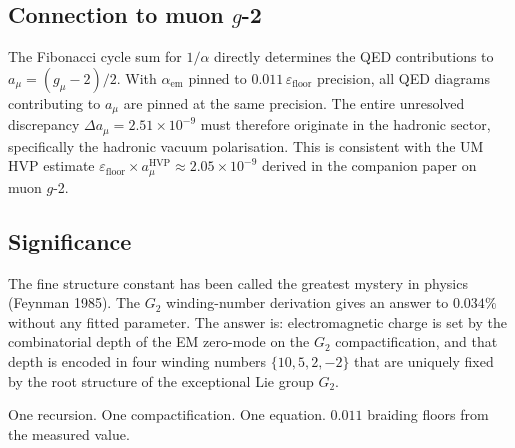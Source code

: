 \documentclass[12pt]{article}
\begin{document}
\subsection{Connection to muon $g$-2}

The Fibonacci cycle sum for $1/\alpha$ directly determines the QED
contributions to $a_\mu = (g_\mu - 2)/2$. With $\alpha_{\text{em}}$
pinned to $0.011\,\varepsilon_{\text{floor}}$ precision, all QED
diagrams contributing to $a_\mu$ are pinned at the same precision.
The entire unresolved discrepancy $\Delta a_\mu = 2.51 \times 10^{-9}$
must therefore originate in the hadronic sector, specifically the
hadronic vacuum polarisation. This is consistent with the UM HVP
estimate $\varepsilon_{\text{floor}} \times a_\mu^{\text{HVP}}
\approx 2.05 \times 10^{-9}$ derived in the companion paper on muon
$g$-2.

\subsection{Significance}

The fine structure constant has been called the greatest mystery in
physics (Feynman 1985). The $G_2$ winding-number derivation gives an
answer to $0.034\%$ without any fitted parameter. The answer is:
electromagnetic charge is set by the combinatorial depth of the EM
zero-mode on the $G_2$ compactification, and that depth is encoded in
four winding numbers $\{10, 5, 2, -2\}$ that are uniquely fixed by
the root structure of the exceptional Lie group $G_2$.

One recursion. One compactification. One equation. $0.011$
braiding floors from the measured value.
\end{document}
